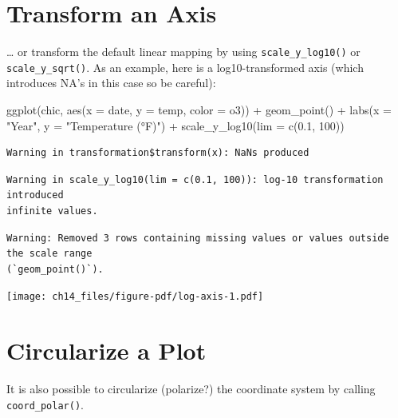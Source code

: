 \documentclass[
  letterpaper,
]{scrbook}
\newenvironment{Shaded}{\begin{snugshade}}{\end{snugshade}}
\newcommand{\AttributeTok}[1]{\textcolor[rgb]{0.40,0.45,0.13}{#1}}
\newcommand{\DecValTok}[1]{\textcolor[rgb]{0.68,0.00,0.00}{#1}}
\newcommand{\FloatTok}[1]{\textcolor[rgb]{0.68,0.00,0.00}{#1}}
\newcommand{\FunctionTok}[1]{\textcolor[rgb]{0.28,0.35,0.67}{#1}}
\newcommand{\NormalTok}[1]{\textcolor[rgb]{0.00,0.23,0.31}{#1}}
\newcommand{\SpecialCharTok}[1]{\textcolor[rgb]{0.37,0.37,0.37}{#1}}
\newcommand{\StringTok}[1]{\textcolor[rgb]{0.13,0.47,0.30}{#1}}
\begin{document}
\section{Transform an Axis}\label{transform-an-axis}

\ldots{} or transform the default linear mapping by using
\texttt{scale\_y\_log10()} or \texttt{scale\_y\_sqrt()}. As an example,
here is a log10-transformed axis (which introduces NA's in this case so
be careful):

\begin{Shaded}
\begin{Highlighting}[]
\FunctionTok{ggplot}\NormalTok{(chic, }\FunctionTok{aes}\NormalTok{(}\AttributeTok{x =}\NormalTok{ date, }\AttributeTok{y =}\NormalTok{ temp, }\AttributeTok{color =}\NormalTok{ o3)) }\SpecialCharTok{+}
  \FunctionTok{geom\_point}\NormalTok{() }\SpecialCharTok{+}
  \FunctionTok{labs}\NormalTok{(}\AttributeTok{x =} \StringTok{"Year"}\NormalTok{, }\AttributeTok{y =} \StringTok{"Temperature (°F)"}\NormalTok{) }\SpecialCharTok{+}
  \FunctionTok{scale\_y\_log10}\NormalTok{(}\AttributeTok{lim =} \FunctionTok{c}\NormalTok{(}\FloatTok{0.1}\NormalTok{, }\DecValTok{100}\NormalTok{))}
\end{Highlighting}
\end{Shaded}

\begin{verbatim}
Warning in transformation$transform(x): NaNs produced
\end{verbatim}

\begin{verbatim}
Warning in scale_y_log10(lim = c(0.1, 100)): log-10 transformation introduced
infinite values.
\end{verbatim}

\begin{verbatim}
Warning: Removed 3 rows containing missing values or values outside the scale range
(`geom_point()`).
\end{verbatim}

\texttt{[image: ch14\_files/figure-pdf/log-axis-1.pdf]}

\section{Circularize a Plot}\label{circularize-a-plot}

It is also possible to circularize (polarize?) the coordinate system by
calling \texttt{coord\_polar()}.
\end{document}
